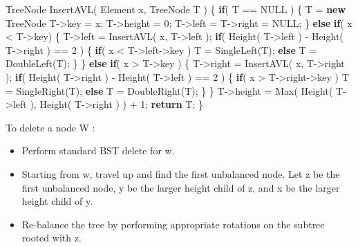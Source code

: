 \documentclass[]{article}
\newenvironment{Shaded}{}{}
\newcommand{\KeywordTok}[1]{\textcolor[rgb]{0.00,0.44,0.13}{\textbf{#1}}}
\newcommand{\DecValTok}[1]{\textcolor[rgb]{0.25,0.63,0.44}{#1}}
\newcommand{\ControlFlowTok}[1]{\textcolor[rgb]{0.00,0.44,0.13}{\textbf{#1}}}
\newcommand{\NormalTok}[1]{#1}
\begin{document}
\begin{Shaded}
\begin{Highlighting}[]
\NormalTok{TreeNode InsertAVL( Element x, TreeNode T )}
\NormalTok{\{}
    \ControlFlowTok{if}\NormalTok{( T == NULL )}
\NormalTok{    \{}
\NormalTok{        T = }\KeywordTok{new}\NormalTok{ TreeNode}
\NormalTok{        T->key = x;}
\NormalTok{        T->height = }\DecValTok{0}\NormalTok{;}
\NormalTok{        T->left = T->right = NULL;}
\NormalTok{    \}}
    \ControlFlowTok{else}
        \ControlFlowTok{if}\NormalTok{( x < T->key)}
\NormalTok{        \{}
\NormalTok{            T->left = InsertAVL( x, T->left );}
            \ControlFlowTok{if}\NormalTok{( Height( T->left ) - Height( T->right ) == }\DecValTok{2}\NormalTok{ )}
\NormalTok{            \{}
                \ControlFlowTok{if}\NormalTok{( x < T->left->key )}
\NormalTok{                    T = SingleLeft(T);}
                \ControlFlowTok{else}
\NormalTok{                    T = DoubleLeft(T);}
\NormalTok{            \}}
\NormalTok{        \}}
        \ControlFlowTok{else}
            \ControlFlowTok{if}\NormalTok{( x > T->key )}
\NormalTok{            \{}
\NormalTok{                T->right = InsertAVL( x, T->right );}
                \ControlFlowTok{if}\NormalTok{( Height( T->right ) - Height( T->left ) == }\DecValTok{2}\NormalTok{ )}
\NormalTok{                \{}
                    \ControlFlowTok{if}\NormalTok{( x > T->right->key )}
\NormalTok{                        T = SingleRight(T);}
                    \ControlFlowTok{else}
\NormalTok{                        T = DoubleRight(T);}
\NormalTok{                \}}
\NormalTok{            \}}
\NormalTok{    T->height = Max( Height( T->left ), Height( T->right ) ) + }\DecValTok{1}\NormalTok{;}
    \ControlFlowTok{return}\NormalTok{ T;}
\NormalTok{\}}
\end{Highlighting}
\end{Shaded}

 To delete a node W :

\begin{itemize}
\item
  Perform standard BST delete for w.
\item
  Starting from w, travel up and find the first unbalanced node. Let z
  be the first unbalanced node, y be the larger height child of z, and x
  be the larger height child of y. 
\item
  Re-balance the tree by performing appropriate rotations on the subtree
  rooted with z. 
\end{itemize}
\end{document}
